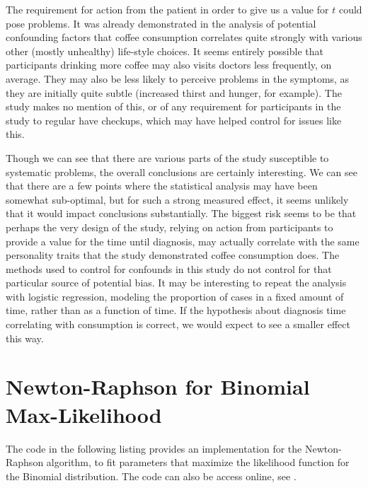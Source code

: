 \documentclass{article}
\begin{document}
The requirement for action from the patient in order to give us a
value for \(t\) could pose problems. It was already demonstrated in
the analysis of potential confounding factors that coffee consumption
correlates quite strongly with various other (mostly unhealthy)
life-style choices. It seems entirely possible that participants
drinking more coffee may also visits doctors less frequently, on
average. They may also be less likely to perceive problems in the
symptoms, as they are initially quite subtle (increased thirst
and hunger, for example). The study makes no mention of this, or of
any requirement for participants in the study to regular have
checkups, which may have helped control for issues like this.

Though we can see that there are various parts of the study
susceptible to systematic problems, the overall conclusions are
certainly interesting. We can see that there are a few points where
the statistical analysis may have been somewhat sub-optimal, but for such a
strong measured effect, it seems unlikely that it would impact
conclusions substantially. The biggest risk seems to be that perhaps
the very design of the study, relying on action from participants to
provide a value for the time until diagnosis, may actually correlate
with the same personality traits that the study demonstrated coffee
consumption does. The methods used to control for confounds in this
study do not control for that particular source of potential bias. It
may be interesting to repeat the analysis with logistic regression,
modeling the proportion of cases in a fixed amount of time, rather
than as a function of time. If the hypothesis about diagnosis time
correlating with consumption is correct, we would expect to see a
smaller effect this way.

\section{Newton-Raphson for Binomial Max-Likelihood}

The code in the following listing provides an implementation for the
Newton-Raphson algorithm, to fit parameters that maximize the
likelihood function for the Binomial distribution. The code can also
be access online, see \cite{github}.


\end{document}
